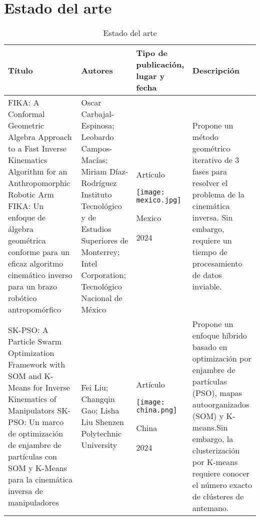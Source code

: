 \section{Estado del arte}

\begin{table}[h]
	\caption{Estado del arte}
	\begin{tabular}{p{5cm}p{4cm}p{3.6cm}p{4cm}}
		\textbf{Título} & \textbf{Autores} & \textbf{Tipo de publicación, lugar y fecha} & \textbf{Descripción} \\ 
		\midrule
		FIKA: A Conformal Geometric Algebra Approach to a Fast Inverse Kinematics Algorithm for an Anthropomorphic Robotic Arm \cite{estado1} \newline\newline
		FIKA: Un enfoque de álgebra geométrica conforme para un eficaz algoritmo cinemático inverso para un brazo robótico antropomórfico &  
		Oscar Carbajal-Espinosa; Leobardo Campos-Macías; Miriam Díaz-Rodríguez \newline\newline
		Instituto Tecnológico y de Estudios Superiores de Monterrey; Intel Corporation; Tecnológico Nacional de México & 
		\begin{center}Artículo \par \texttt{[image: mexico.jpg]} \par Mexico \par 2024\end{center} & 
		Propone un método geométrico iterativo de 3 fases para resolver el problema de la cinemática inversa.\newline\newline
		Sin embargo, requiere un tiempo de procesamiento de datos inviable.\\
		\midrule
		SK-PSO: A Particle Swarm Optimization Framework with SOM and K-Means for Inverse Kinematics of Manipulators \cite{estado2} \newline\newline
		SK-PSO: Un marco de optimización de enjambre de partículas con SOM y K-Means para la cinemática inversa de manipuladores &  
		Fei Liu; Changqin Gao; Lisha Liu \newline\newline 
		Shenzen Polytechnic University & 
		\begin{center}Artículo \par \texttt{[image: china.png]} \par China \par 2024\end{center} & 
		Propone un enfoque híbrido basado en optimización por enjambre de partículas (PSO), mapas autoorganizados (SOM) y K-means.\newline\newline Sin embargo, la clusterización por K-means requiere conocer el número exacto de clústeres de antemano. \\
	\end{tabular}
\end{table}

